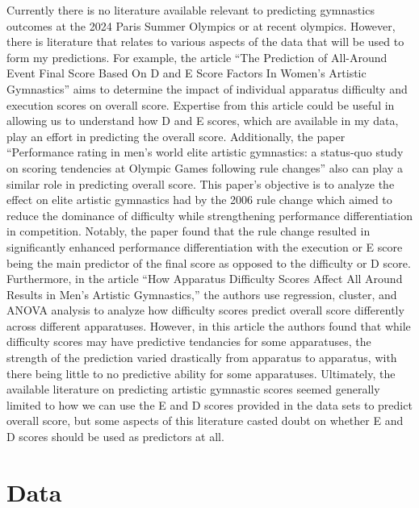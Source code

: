 \documentclass[12pt]{article}
\begin{document}
Currently there is no literature available relevant to predicting gymnastics outcomes at the 2024 
Paris Summer Olympics or at recent olympics. However, there is literature that relates to various aspects of 
the data that will be used to form my predictions. For example, the article ``The Prediction of All-Around 
Event Final Score Based On D and E Score Factors In Women's Artistic Gymnastics'' aims to determine the 
impact of individual apparatus difficulty and execution scores on overall score. 
Expertise from this article could be useful in allowing us to understand how D and E scores, 
which are available in my data, play an effort in predicting the overall score. Additionally, the paper 
``Performance rating in men’s world elite artistic gymnastics: a status-quo study on scoring 
tendencies at Olympic Games following rule changes'' also can play a similar role in predicting overall 
score. This paper's objective is to analyze the effect on elite artistic gymnastics had by the 2006 rule change 
which aimed to reduce the dominance of difficulty while strengthening performance differentiation in 
competition. Notably, the paper found that the rule change resulted in significantly enhanced performance 
differentiation with the execution or E score being the main predictor of the final score as opposed to 
the difficulty or D score. Furthermore, in the article ``How Apparatus Difficulty Scores Affect All 
Around Results in Men's Artistic Gymnastics,'' the authors use regression, cluster, and ANOVA analysis to 
analyze how difficulty scores predict overall score differently across different apparatuses. However, in this 
article the authors found that while difficulty scores may have predictive tendancies for some apparatuses, 
the strength of the prediction varied drastically from apparatus to apparatus, with there being little to no 
predictive ability for some apparatuses. Ultimately, the available literature on predicting artistic 
gymnastic scores seemed generally limited to how we can use the E and D scores provided in the data sets 
to predict overall score, but some aspects of this literature casted doubt on whether E and D scores should be 
used as predictors at all.

\section{Data}
\label{sec:data}
\end{document}
